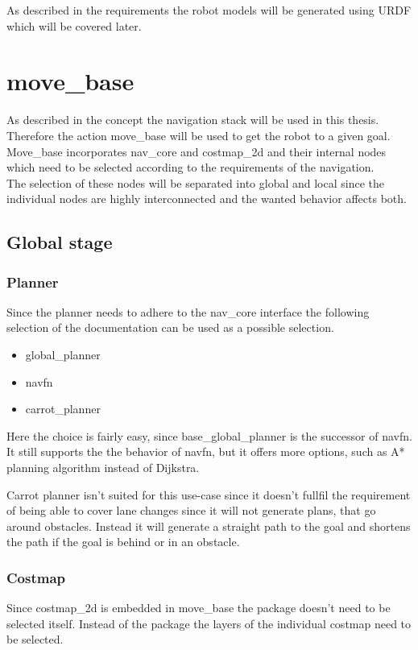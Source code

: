 As described in the requirements the robot models will be generated using URDF which will be covered later.

\section{move\_base}

As described in the concept the navigation stack will be used in this thesis. Therefore the action move\_base will be used to get the robot to a given goal.\\
 Move\_base incorporates nav\_core and costmap\_2d and their internal nodes which need to be selected according to the requirements of the navigation.\\ 
The selection of these nodes will be separated into global and local since the individual nodes are highly interconnected and the wanted behavior affects both.

\subsection{Global stage}


\subsubsection{Planner}

Since the planner needs to adhere to the nav\_core interface \cite{navcore} the following selection of the documentation can be used as a possible selection.

\begin{itemize}
	\item global\_planner
	\item navfn
	\item carrot\_planner
\end{itemize}


Here the choice is fairly easy, since base\_global\_planner is the successor of navfn. It still supports the the behavior of navfn, but it offers more options, such as A* planning algorithm instead of Dijkstra.


Carrot planner isn't suited for this use-case since it doesn't fullfil the requirement of being able to cover lane changes since it will not generate plans, that go around obstacles. Instead it will generate a straight path to the goal and shortens the path if the goal is behind or in an obstacle\cite{corrotplanner}.

\subsubsection{Costmap}
Since costmap\_2d is embedded in move\_base the package doesn't need to be selected itself. Instead of the package the layers of the individual costmap need to be selected.\\

